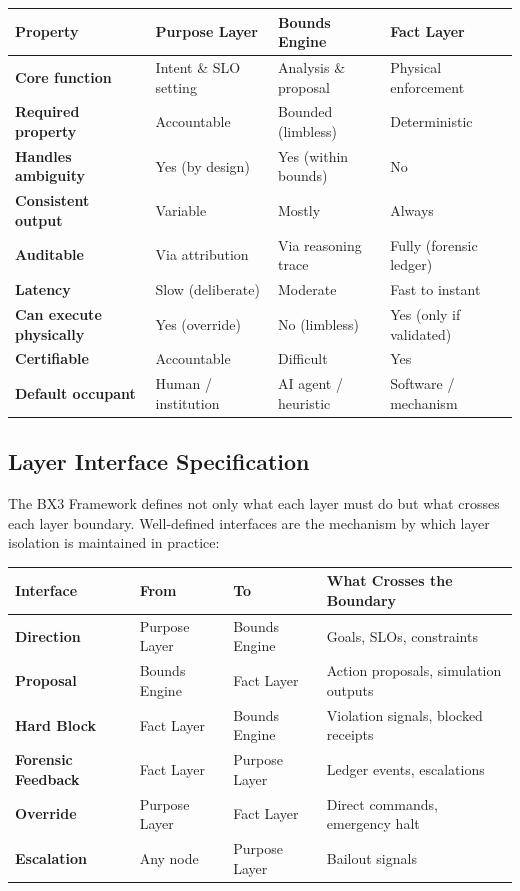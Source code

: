 \documentclass[12pt]{article}
\begin{document}
\begin{center}
\begin{tabular}{>{\bfseries}p{2.6cm} p{3.3cm} p{3.3cm} p{3.3cm}}
\toprule
\textbf{Property} & \textbf{Purpose Layer} & \textbf{Bounds Engine} & \textbf{Fact Layer} \\
\midrule
Core function & Intent \& SLO setting & Analysis \& proposal & Physical enforcement \\
\addlinespace
Required property & Accountable & Bounded (limbless) & Deterministic \\
\addlinespace
Handles ambiguity & Yes (by design) & Yes (within bounds) & No \\
\addlinespace
Consistent output & Variable & Mostly & Always \\
\addlinespace
Auditable & Via attribution & Via reasoning trace & Fully (forensic ledger) \\
\addlinespace
Latency & Slow (deliberate) & Moderate & Fast to instant \\
\addlinespace
Can execute physically & Yes (override) & No (limbless) & Yes (only if validated) \\
\addlinespace
Certifiable & Accountable & Difficult & Yes \\
\addlinespace
Default occupant & Human / institution & AI agent / heuristic & Software / mechanism \\
\bottomrule
\end{tabular}
\end{center}

\subsection{Layer Interface Specification}

The BX3 Framework defines not only what each layer must do but what crosses each layer boundary. Well-defined interfaces are the mechanism by which layer isolation is maintained in practice:

\begin{center}
\begin{tabular}{>{\bfseries}p{2.5cm} p{2.0cm} p{2.0cm} p{5.5cm}}
\toprule
\textbf{Interface} & \textbf{From} & \textbf{To} & \textbf{What Crosses the Boundary} \\
\midrule
Direction & Purpose Layer & Bounds Engine & Goals, SLOs, constraints \\
\addlinespace
Proposal & Bounds Engine & Fact Layer & Action proposals, simulation outputs \\
\addlinespace
Hard Block & Fact Layer & Bounds Engine & Violation signals, blocked receipts \\
\addlinespace
Forensic Feedback & Fact Layer & Purpose Layer & Ledger events, escalations \\
\addlinespace
Override & Purpose Layer & Fact Layer & Direct commands, emergency halt \\
\addlinespace
Escalation & Any node & Purpose Layer & Bailout signals \\
\bottomrule
\end{tabular}
\end{center}
\end{document}
